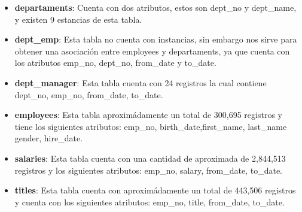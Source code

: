 	\begin{itemize}
	\item \textbf{departaments}: Cuenta con dos atributos, estos son dept\_no y dept\_name, y existen 9 estancias de esta tabla.\\
	\item \textbf{dept\_emp}: Esta tabla no cuenta con instancias, sin embargo nos sirve para obtener una asociación entre employees y departaments, ya que cuenta con los atributos emp\_no, dept\_no, from\_date y to\_date.\\
	\item \textbf{dept\_manager}: Esta tabla cuenta con 24 registros la cual contiene dept\_no, emp\_no, from\_date, to\_date.\\
	\item \textbf{employees}: Esta tabla aproximádamente un total de 300,695 registros y tiene los siguientes atributos:  emp\_no, birth\_date,first\_name, last\_name 	gender, hire\_date.\\
	\item \textbf{salaries}: Esta tabla cuenta con una cantidad de aproximada de 2,844,513 registros y los siguientes atributos:  emp\_no, salary, from\_date, to\_date.\\ 
	\item \textbf{titles}: Esta tabla cuenta con aproximádamente un total de 443,506 registros y cuenta con los siguientes atributos:  emp\_no,	title, from\_date, to\_date.\\
	\end{itemize}

